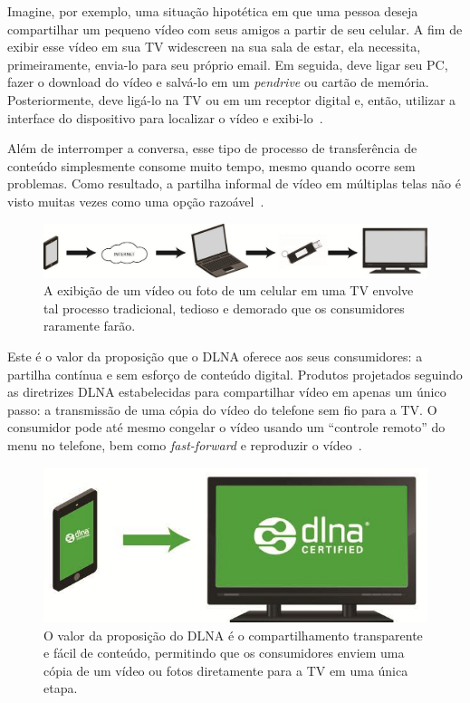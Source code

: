 Imagine, por exemplo, uma situação hipotética em que uma pessoa deseja compartilhar um pequeno vídeo com seus amigos a partir de seu celular. A fim de exibir esse vídeo em sua TV widescreen na sua sala de estar, ela necessita, primeiramente, envia-lo para seu próprio email. Em seguida, deve ligar seu PC, fazer o download do vídeo e salvá-lo em um \emph{pendrive} ou cartão de memória. Posteriormente, deve ligá-lo na TV ou em um receptor digital e, então, utilizar a interface do dispositivo para localizar o vídeo e exibi-lo~\cite{dlnahdvideostreaming}.

Além de interromper a conversa, esse tipo de processo de transferência de conteúdo simplesmente consome muito tempo, mesmo quando ocorre sem problemas. Como resultado, a partilha informal de vídeo em múltiplas telas não é visto muitas vezes como uma opção razoável~\cite{dlnahdvideostreaming}.

\begin{figure}[ht]
	\center
	\includegraphics[scale=0.3]{imagens/dlna1}
	\caption{A exibição de um vídeo ou foto de um celular em uma TV envolve tal processo tradicional, tedioso e demorado que os consumidores raramente farão.}
	\label{fig:traditionalProccess}
\end{figure}

Este é o valor da proposição que o DLNA oferece aos seus consumidores: a partilha contínua e sem esforço de conteúdo digital. Produtos projetados seguindo as diretrizes DLNA estabelecidas para compartilhar vídeo em apenas um único passo: a transmissão de uma cópia do vídeo do telefone sem fio para a TV. O consumidor pode até mesmo congelar o vídeo usando um ``controle remoto'' do menu no telefone, bem como \emph{fast-forward} e reproduzir o vídeo~\cite{dlnahdvideostreaming}.

\begin{figure}[ht]
	\center
	\includegraphics[scale=0.3]{imagens/dlna2}
	\caption{O valor da proposição do DLNA é o compartilhamento transparente e fácil de conteúdo, permitindo que os consumidores enviem uma cópia de um vídeo ou fotos diretamente para a TV em uma única etapa.}
	\label{fig:dlnaProccess}
\end{figure}

